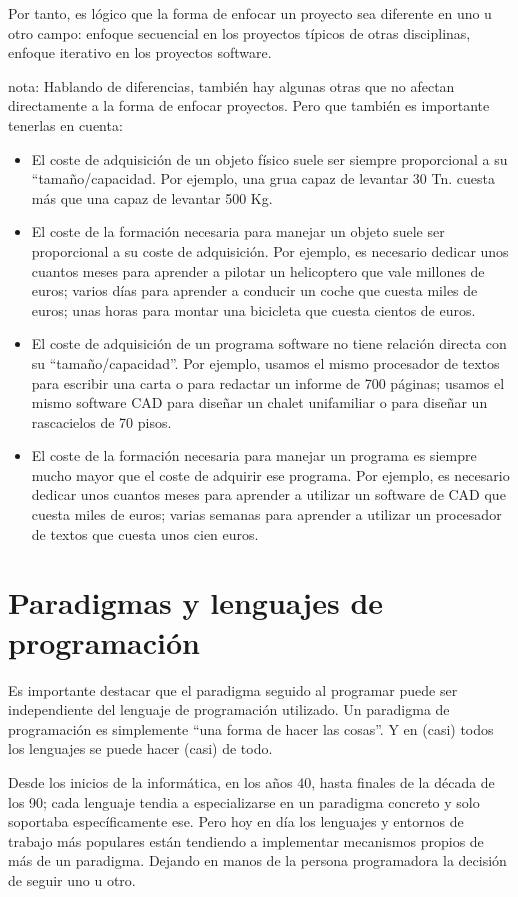 \documentclass[spanish,12pt,a4paper,final,oneside]{book}
\begin{document}
Por tanto, es lógico que la forma de enfocar un proyecto sea diferente en uno u otro campo: enfoque secuencial en los proyectos típicos de otras disciplinas, enfoque iterativo en los proyectos software.

nota: Hablando de diferencias, también hay algunas otras que no afectan directamente a la forma de enfocar proyectos. Pero que también es importante tenerlas en cuenta:
\begin{itemize}
\item El coste de adquisición de un objeto físico suele ser siempre proporcional a su ``tamaño/capacidad. Por ejemplo, una grua capaz de levantar 30 Tn. cuesta más que una capaz de levantar 500 Kg.
\item El coste de la formación necesaria para manejar un objeto suele ser proporcional a su coste de adquisición. Por ejemplo, es necesario dedicar unos cuantos meses para aprender a pilotar un helicoptero que vale millones de euros; varios días para aprender a conducir un coche que cuesta miles de euros; unas horas para montar una bicicleta que cuesta cientos de euros.
\item El coste de adquisición de un programa software no tiene relación directa con su ``tamaño/capacidad''. Por ejemplo, usamos el mismo procesador de textos para escribir una carta o para redactar un informe de 700 páginas; usamos el mismo software CAD para diseñar un chalet unifamiliar o para diseñar un rascacielos de 70 pisos.
\item El coste de la formación necesaria para manejar un programa es siempre mucho mayor que el coste de adquirir ese programa. Por ejemplo, es necesario dedicar unos cuantos meses para aprender a utilizar un software de CAD que cuesta miles de euros; varias semanas para aprender a utilizar un procesador de textos que cuesta unos cien euros.
\end{itemize}

\chapter{Paradigmas y lenguajes de programación}
Es importante destacar que el paradigma seguido al programar puede ser independiente del lenguaje de programación utilizado. Un paradigma de programación es simplemente ``una forma de hacer las cosas''. Y en (casi) todos los lenguajes se puede hacer (casi) de todo.

Desde los inicios de la informática, en los años 40, hasta finales de la década de los 90; cada lenguaje tendia a especializarse en un paradigma concreto y solo soportaba específicamente ese. Pero hoy en día los lenguajes y entornos de trabajo más populares están tendiendo a implementar mecanismos propios de más de un paradigma. Dejando en manos de la persona programadora la decisión de seguir uno u otro.
\end{document}
